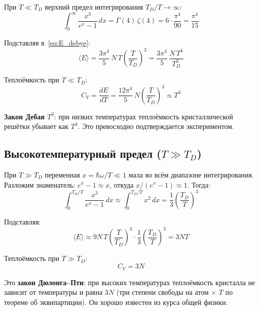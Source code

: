 \documentclass[../general/general]{subfiles}
\begin{document}
При $T \ll T_D$ верхний предел интегрирования $T_D/T \to \infty$:
\begin{equation}
    \int_0^{\infty}\frac{x^3}{e^x-1}\,dx = \Gamma(4)\,\zeta(4) = 6\cdot\frac{\pi^4}{90} = \frac{\pi^4}{15}
\end{equation}

Подставляя в~\eqref{eq:E_debye}:
\begin{equation}
    \langle E\rangle = \frac{3\pi^4}{5}\,N\,T\!\left(\frac{T}{T_D}\right)^{\!3} = \frac{3\pi^4}{5}\,\frac{N\,T^4}{T_D^3}
    \label{eq:E_lowT}
\end{equation}

Теплоёмкость при $T \ll T_D$:
\begin{equation}
    \boxed{C_V = \frac{dE}{dT} = \frac{12\pi^4}{5}\,N\!\left(\frac{T}{T_D}\right)^{\!3} \propto T^3}
    \label{eq:Cv_T3}
\end{equation}

\textbf{Закон Дебая $T^3$}: при низких температурах теплоёмкость кристаллической решётки убывает как $T^3$. Это превосходно подтверждается экспериментом.

\subsection{Высокотемпературный предел ($T \gg T_D$)}

При $T \gg T_D$ переменная $x = \hbar\omega/T \ll 1$ мала во всём диапазоне интегрирования. Разложим знаменатель: $e^x - 1 \approx x$, откуда $x/(e^x - 1) \approx 1$. Тогда:
\begin{equation}
    \int_0^{T_D/T}\frac{x^3}{e^x-1}\,dx \approx \int_0^{T_D/T} x^2\,dx = \frac{1}{3}\!\left(\frac{T_D}{T}\right)^{\!3}
\end{equation}

Подставляя:
\begin{equation}
    \langle E\rangle \approx 9N\,T\!\left(\frac{T}{T_D}\right)^{\!3}\cdot\frac{1}{3}\!\left(\frac{T_D}{T}\right)^{\!3} = 3NT
    \label{eq:E_highT}
\end{equation}

Теплоёмкость при $T \gg T_D$:
\begin{equation}
    \boxed{C_V = 3N}
    \label{eq:Cv_dulongpetit}
\end{equation}

Это \textbf{закон Дюлонга--Пти}: при высоких температурах теплоёмкость кристалла не зависит от температуры и равна $3N$ (три степени свободы на атом $\times$ $T$ по теореме об экви\-пар\-тиции). Он хорошо известен из курса общей физики.
\end{document}
